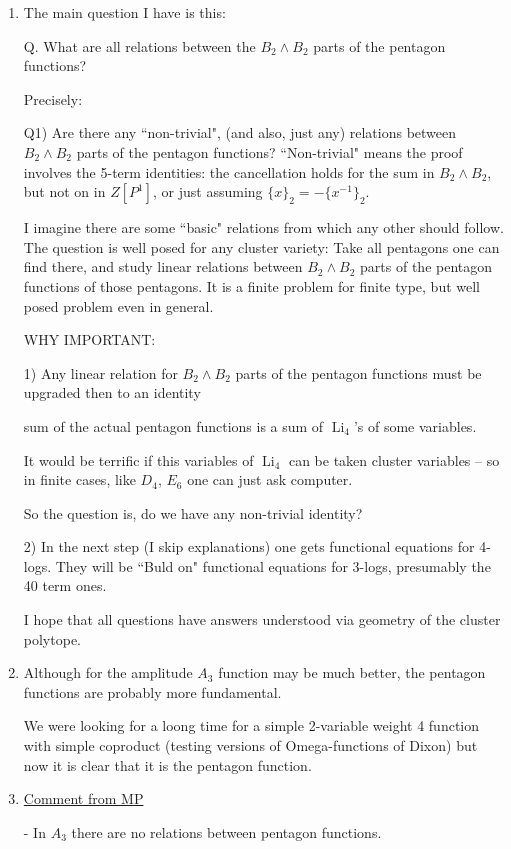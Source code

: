\documentclass[12pt]{article}
\DeclareMathOperator{\Li}{Li}
\begin{document}
\begin{enumerate}
\item The main question I have is this:

Q. What are all relations between the $B_2 \wedge B_2$ parts of the
pentagon functions?

Precisely:

Q1) Are there any ``non-trivial", (and also, just any) relations
between $B_2 \wedge B_2$ parts of the pentagon functions? ``Non-trivial"
means the proof
involves the 5-term identities: the cancellation holds for the sum in
$B_2 \wedge B_2$, but not on in $Z[P^1]$, or just assuming $\{x\}_2 = -
\{x^{-1}\}_2$.

I imagine there are some ``basic" relations from which any other should follow.
The question is well posed for any cluster variety:
Take all pentagons one can find there, and study linear relations between
$B_2 \wedge B_2$ parts of the pentagon functions of those pentagons.
It is a finite problem for finite type, but well posed problem even in general.

WHY IMPORTANT:

1) Any linear relation for
$B_2 \wedge B_2$ parts of the pentagon functions must be upgraded then
to an identity

sum of the actual pentagon functions is a sum of $\Li_4$'s of some variables.

It would be terrific if this variables of $\Li_4$ can be taken cluster
variables --
so in finite cases, like $D_4$, $E_6$ one can just ask computer.

So the question is, do we have any non-trivial identity?

2) In the next step (I skip explanations) one gets functional
equations for 4-logs.
They will be ``Buld on" functional equations for 3-logs, presumably the
40 term ones.

I hope that all questions have answers understood via
geometry of the cluster polytope.

\item Although for the amplitude $A_3$ function may be much better,
the pentagon functions are probably more fundamental.

We were looking for a loong time for a simple 2-variable
weight 4 function with simple coproduct (testing versions of
Omega-functions of Dixon)
but now it is clear that it is the pentagon function.

\item \underline{Comment from MP}

- In $A_3$ there are no relations between pentagon functions. 


\end{enumerate}
\end{document}
